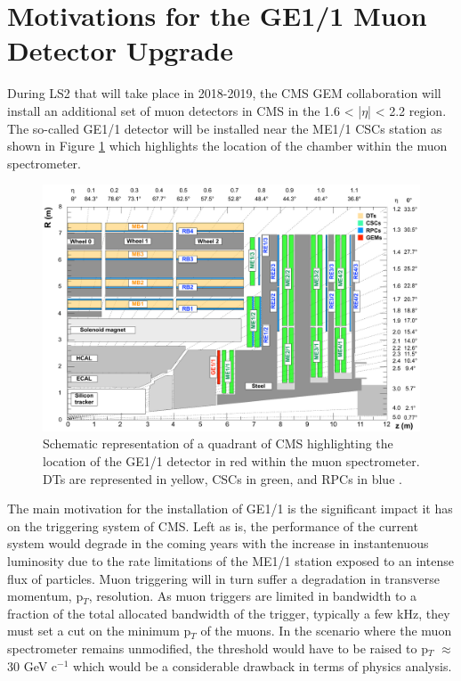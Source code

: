   \section{Motivations for the GE1/1 Muon Detector Upgrade}

    During LS2 that will take place in 2018-2019, the CMS GEM collaboration \cite{Colaleo:2021453} will install an additional set of muon detectors in CMS in the 1.6 < |$\eta$| < 2.2 region. The so-called GE1/1 detector will be installed near the ME1/1 CSCs station as shown in Figure \ref{fig:II-1-ge11} which highlights the location of the chamber within the muon spectrometer. \\

    \begin{figure}[h!]
      \centering
      \includegraphics[width=\textwidth]{img/II-1-gem/ge11-quadrant.pdf}
      \caption{Schematic representation of a quadrant of CMS highlighting the location of the GE1/1 detector in red within the muon spectrometer. DTs are represented in yellow, CSCs in green, and RPCs in blue \cite{Colaleo:2021453}.}
      \label{fig:II-1-ge11}
    \end{figure}

    The main motivation for the installation of GE1/1 is the significant impact it has on the triggering system of CMS. Left as is, the performance of the current system would degrade in the coming years with the increase in instantenuous luminosity due to the rate limitations of the ME1/1 station exposed to an intense flux of particles. Muon triggering will in turn suffer a degradation in transverse momentum, p$_T$, resolution. As muon triggers are limited in bandwidth to a fraction of the total allocated bandwidth of the trigger, typically a few kHz, they must set a cut on the minimum p$_T$ of the muons. In the scenario where the muon spectrometer remains unmodified, the threshold would have to be raised to p$_T$ $ \approx $ 30 GeV c$^{-1}$ which would be a considerable drawback in terms of physics analysis. \\

